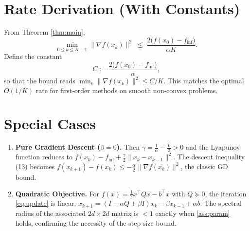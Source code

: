 \documentclass{article}
\newcommand{\grad}{\nabla}
\begin{document}
\section*{Rate Derivation (With Constants)}
From Theorem \ref{thm:main},
\[
\min_{0\le k\le K-1}\|\grad f(x_k)\|^2
\;\le\;
\frac{2\bigl(f(x_0)-f_{\inf}\bigr)}{\alpha K}.
\]
Define the constant
\[
C := \frac{2\bigl(f(x_0)-f_{\inf}\bigr)}{\alpha},
\]
so that the bound reads $\min_{k}\|\grad f(x_k)\|^2 \le C/K$. This matches the optimal $O(1/K)$ rate for first‑order methods on smooth non‑convex problems.

\section*{Special Cases}
\begin{enumerate}
    \item \textbf{Pure Gradient Descent ($\beta=0$).} Then $\gamma = \frac{1}{\alpha}-\frac{L}{2}>0$ and the Lyapunov function reduces to $f(x_k)-f_{\inf}+\frac{\gamma}{2}\|x_k-x_{k-1}\|^2$. The descent inequality (13) becomes $f(x_{k+1})-f(x_k)\le -\frac{\alpha}{2}\|\grad f(x_k)\|^2$, the classic GD bound.
    \item \textbf{Quadratic Objective.} For $f(x)=\tfrac12 x^\top Q x-b^\top x$ with $Q\succeq 0$, the iteration \eqref{eq:update} is linear:
    $x_{k+1}= (I-\alpha Q +\beta I)x_k -\beta x_{k-1}+ \alpha b$.
    The spectral radius of the associated $2d\times2d$ matrix is $<1$ exactly when \ref{ass:param} holds, confirming the necessity of the step‑size bound.
\end{enumerate}
\end{document}
